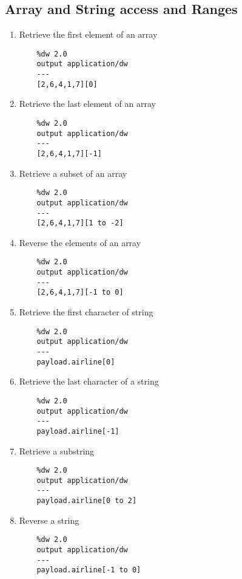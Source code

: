 \subsection{Array and String access and Ranges}
\begin{enumerate}[resume*]
\item Retrieve the first element of an array
  \begin{verbatim}
    %dw 2.0
    output application/dw
    ---
    [2,6,4,1,7][0]
  \end{verbatim}
\item Retrieve the last element of an array
  \begin{verbatim}
    %dw 2.0
    output application/dw
    ---
    [2,6,4,1,7][-1]
  \end{verbatim}
\item Retrieve a subset of an array
  \begin{verbatim}
    %dw 2.0
    output application/dw
    ---
    [2,6,4,1,7][1 to -2]    
  \end{verbatim}
\item Reverse the elements of an array
  \begin{verbatim}
    %dw 2.0
    output application/dw
    ---
    [2,6,4,1,7][-1 to 0]
  \end{verbatim}
\item Retrieve the first character of string
  \begin{verbatim}
    %dw 2.0
    output application/dw
    ---
    payload.airline[0]
  \end{verbatim}
\item Retrieve the last character of a string
  \begin{verbatim}
    %dw 2.0
    output application/dw
    ---
    payload.airline[-1]
  \end{verbatim}
\item Retrieve a substring
  \begin{verbatim}
    %dw 2.0
    output application/dw
    ---
    payload.airline[0 to 2]
  \end{verbatim}
\item Reverse a string
  \begin{verbatim}
    %dw 2.0
    output application/dw
    ---
    payload.airline[-1 to 0]
  \end{verbatim}
\end{enumerate}

